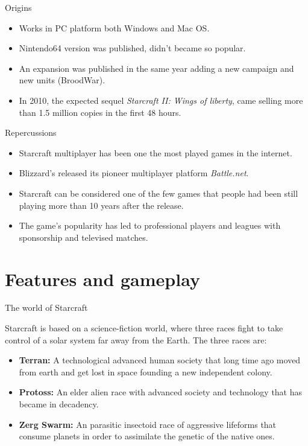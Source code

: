 \documentclass[10pt]{beamer}
\begin{document}
\begin{frame}{Origins}

	  \begin{itemize}
	   \item Works in PC platform both Windows and Mac OS.
	   \item Nintendo64 version was published, didn't became so popular.
	   \item An expansion was published in the same year adding a new campaign and new units (BroodWar).
	   \item In 2010, the expected sequel \textit{Starcraft II: Wings of liberty}, came selling more than 1.5 million copies in the first 48 hours.
	  \end{itemize}
\end{frame}

\begin{frame}{Repercussions}

	  \begin{itemize}
	   \item Starcraft multiplayer has been one the most played games in the internet.
	   \item Blizzard's released its pioneer multiplayer platform \textit{Battle.net}.
	   \item Starcraft can be considered one of the few games that people had been still playing more than 10 years after the release.
	   \item The game's popularity has led to professional players and leagues with sponsorship and televised matches.
	  \end{itemize}
\end{frame}

\section{Features and gameplay}

\begin{frame}{The world of Starcraft}

Starcraft is based on a science-fiction world, where three races fight to take control of a solar system far away from the Earth. The three races are:

    \begin{itemize}
     \item \textbf{Terran:} A technological advanced human society that long time ago moved from earth and get lost in space founding a new independent colony.
     \item \textbf{Protoss:} An elder alien race with advanced society and technology that has became in decadency.
     \item \textbf{Zerg Swarm:} An parasitic insectoid race of aggressive lifeforms that consume planets in order to assimilate the genetic of the native ones.
    \end{itemize}

\end{frame}
\end{document}
